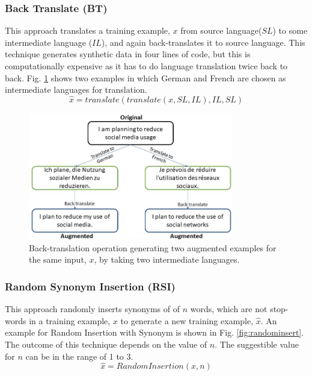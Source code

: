 \documentclass{article}
\begin{document}
\subsubsection{Back Translate (BT)}
This approach translates a training example, $x$ from source language($SL$) to some intermediate language ($IL$), and again back-translates it to source language. This technique generates synthetic data in four lines of code, but this is computationally expensive as it has to do language translation twice back to back. Fig. \ref{fig:backtranslate} shows two examples in which German and French are chosen as intermediate languages for translation.
\begin{equation}
\hat{x} = translate( translate(x, SL, IL), IL, SL)
\end{equation}
\begin{figure}[h!]
\centering
  \includegraphics[width=0.8\textwidth]{backtranslate.jpg}
  \caption{Back-translation operation generating two augmented examples for the same input, $x$, by taking two intermediate languages.}
  \label{fig:backtranslate}
\end{figure}

\subsubsection{Random Synonym Insertion (RSI)}
This approach randomly inserts synonyms of of $n$ words, which are not stop-words in a training example, $x$ to generate a new training example, $\hat{x}$. An example for Random Insertion with Synonym is shown in Fig. \ref{fig:randominsert}. The outcome of this technique depends on the value of $n$. The suggestible value for $n$ can be in the range of 1 to 3. 
\begin{equation}
\hat{x} = RandomInsertion(x, n)
\end{equation}
\end{document}

